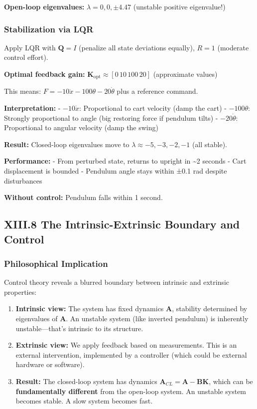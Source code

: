 \documentclass[
]{article}
\begin{document}
\textbf{Open-loop eigenvalues:} \(\lambda = 0, 0, \pm 4.47\) (unstable
positive eigenvalue!)

\subsubsection{Stabilization via LQR}\label{stabilization-via-lqr}

Apply LQR with \(\mathbf{Q} = I\) (penalize all state deviations
equally), \(R = 1\) (moderate control effort).

\textbf{Optimal feedback gain:}
\(\mathbf{K}_{\text{opt}} \approx [0 \, 10 \, 100 \, 20]\) (approximate
values)

This means: \(F = -10\dot{x} - 100\theta - 20\dot{\theta}\) plus a
reference command.

\textbf{Interpretation:} - \(-10\dot{x}\): Proportional to cart velocity
(damp the cart) - \(-100\theta\): Strongly proportional to angle (big
restoring force if pendulum tilts) - \(-20\dot{\theta}\): Proportional
to angular velocity (damp the swing)

\textbf{Result:} Closed-loop eigenvalues move to
\(\lambda \approx -5, -3, -2, -1\) (all stable).

\textbf{Performance:} - From perturbed state, returns to upright in
\textasciitilde2 seconds - Cart displacement is bounded - Pendulum angle
stays within ±0.1 rad despite disturbances

\textbf{Without control:} Pendulum falls within 1 second.

\subsection{XIII.8 The Intrinsic-Extrinsic Boundary and
Control}\label{xiii.8-the-intrinsic-extrinsic-boundary-and-control}

\subsubsection{Philosophical
Implication}\label{philosophical-implication}

Control theory reveals a blurred boundary between intrinsic and
extrinsic properties:

\begin{enumerate}
\def\labelenumi{\arabic{enumi}.}
\item
  \textbf{Intrinsic view:} The system has fixed dynamics \(\mathbf{A}\),
  stability determined by eigenvalues of \(\mathbf{A}\). An unstable
  system (like inverted pendulum) is inherently unstable---that's
  intrinsic to its structure.
\item
  \textbf{Extrinsic view:} We apply feedback based on measurements. This
  is an external intervention, implemented by a controller (which could
  be external hardware or software).
\item
  \textbf{Result:} The closed-loop system has dynamics
  \(\mathbf{A}_{CL} = \mathbf{A} - \mathbf{BK}\), which can be
  \textbf{fundamentally different} from the open-loop system. An
  unstable system becomes stable. A slow system becomes fast.
\end{enumerate}
\end{document}
